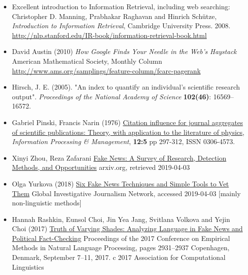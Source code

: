 \documentclass[a4paper,landscape,headrule,footrule,xetex]{foils}
\begin{document}





\begin{itemize}
\item Excellent introduction to Information Retrieval, including web searching:
\\ Christopher D. Manning, Prabhakar Raghavan and Hinrich Schütze, \textit{Introduction to Information Retrieval}, Cambridge University Press. 2008. 
\\ \url{http://nlp.stanford.edu/IR-book/information-retrieval-book.html}
\item David Austin (2010) \textit{How Google Finds Your Needle in the Web's Haystack}
American Mathematical Society, Monthly Column 
\\ \url{http://www.ams.org/samplings/feature-column/fcarc-pagerank}
\item Hirsch, J. E. (2005). "An index to quantify an individual's scientific research output". \textit{Proceedings of the National Academy of Science} \textbf{102(46)}: 16569–16572. 
\item Gabriel Pinski, Francis Narin (1976)
\href{https://doi.org/10.1016/0306-4573(76)90048-0}{Citation influence for journal aggregates of scientific publications: Theory, with application to the literature of physics},
\textit{Information Processing \& Management},
\textbf{12:5}  pp 297-312, ISSN 0306-4573.

\item Xinyi Zhou, Reza Zafarani \href{https://arxiv.org/abs/1812.00315}{Fake News: A Survey of Research, Detection Methods, and Opportunities} arxiv.org, retrieved 2019-04-03
\item Olga Yurkova (2018) \href{https://gijn.org/six-fake-news-techniques-and-simple-tools-to-vet-them/}{Six Fake News Techniques and Simple Tools to Vet Them} Global Investigative Journalism Network, accessed 2019-04-03 [mainly non-linguistic methods]
\item  Hannah Rashkin, Eunsol Choi, Jin Yea Jang, Svitlana Volkova and Yejin Choi (2017) \href{https://www.aclweb.org/anthology/D17-1317/}{Truth of Varying Shades: Analyzing Language in Fake News and Political Fact-Checking} Proceedings of the 2017 Conference on Empirical Methods in Natural Language Processing, pages 2931–2937 Copenhagen, Denmark, September 7–11, 2017. c 2017 Association for Computational Linguistics

\end{itemize}
\end{document}
